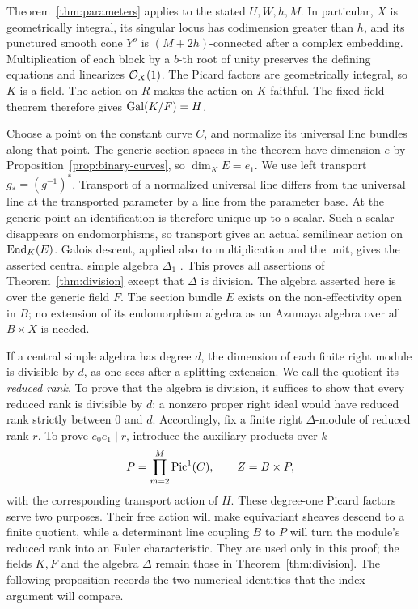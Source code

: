 Theorem~\ref{thm:parameters} applies to the stated \(U,W,h,M\).
In particular, \(X\) is geometrically integral, its singular locus
has codimension greater than \(h\), and its punctured smooth cone
\(Y^o\) is \((M+2h)\)-connected after a complex embedding.
Multiplication of each block by a \(b\)-th root of unity preserves
the defining equations and linearizes \(\mathcal O_X(1)\).
The Picard factors are geometrically integral, so \(K\) is a field.
The action on \(R\) makes the action on \(K\) faithful.  The
fixed-field theorem therefore gives \(\operatorname{Gal}(K/F)=H\).

Choose a point on the constant curve \(C\), and normalize its
universal line bundles along that point.  The generic section
spaces in the theorem have dimension \(e\) by
Proposition~\ref{prop:binary-curves}, so \(\dim_K E=e_1\).
We use left transport \(g_*=(g^{-1})^*\).
Transport of a normalized universal line differs from the universal
line at the transported parameter by a line from the parameter base.
At the generic point an identification is therefore unique up to a
scalar.  Such a scalar disappears on endomorphisms, so transport
gives an actual semilinear action on \(\operatorname{End}_K(E)\).
Galois descent, applied also to multiplication and the unit, gives
the asserted central simple algebra \(\Delta_1\)
\cite[Tag 0CDR]{Stacks}.  This proves all assertions of
Theorem~\ref{thm:division} except that \(\Delta\) is division.
The algebra asserted here is over the generic field \(F\). The section
bundle \(E\) exists on the non-effectivity open in \(B\); no extension
of its endomorphism algebra as an Azumaya algebra over all \(B\times X\)
is needed.

If a central simple algebra has degree \(d\), the dimension of each
finite right module is divisible by \(d\), as one sees after a
splitting extension.  We call the quotient its \emph{reduced rank}.
To prove that the algebra is division, it suffices to show that
every reduced rank is divisible by \(d\): a nonzero proper right ideal
would have reduced rank strictly between \(0\) and \(d\).
Accordingly, fix a finite right \(\Delta\)-module of reduced rank
\(r\).  To prove \(e_0e_1\mid r\), introduce the auxiliary products
over \(k\)
\[
P=\prod_{m=2}^M\operatorname{Pic}^1(C),\qquad Z=B\times P,
\]
with the corresponding transport action of \(H\).
These degree-one Picard factors serve two purposes. Their free action
will make equivariant sheaves descend to a finite quotient, while a
determinant line coupling \(B\) to \(P\) will turn the module's reduced
rank into an Euler characteristic. They are used only in this proof;
the fields \(K,F\) and the algebra \(\Delta\) remain those in
Theorem~\ref{thm:division}. The following proposition records the two
numerical identities that the index argument will compare.

